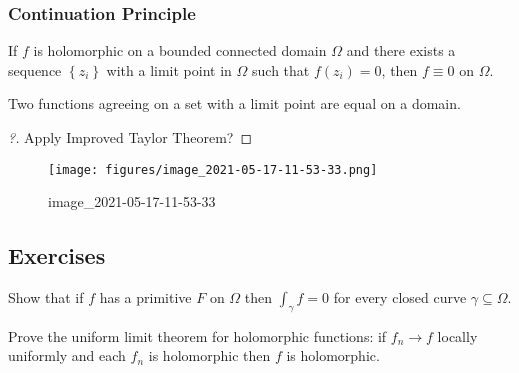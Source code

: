 \hypertarget{continuation-principle}{%
\subsubsection{Continuation Principle}\label{continuation-principle}}

\begin{theorem}

If \(f\) is holomorphic on a bounded connected domain \(\Omega\) and
there exists a sequence \(\left\{{z_i}\right\}\) with a limit point in
\(\Omega\) such that \(f(z_i) = 0\), then \(f\equiv 0\) on \(\Omega\).

\end{theorem}

\begin{slogan}

Two functions agreeing on a set with a limit point are equal on a
domain.

\end{slogan}

\begin{proof}[?]

Apply Improved Taylor Theorem? 

\end{proof}

\begin{exercise}[?]

\begin{figure}
\centering
\texttt{[image: figures/image\_2021-05-17-11-53-33.png]}
\caption{image\_2021-05-17-11-53-33}
\end{figure}

\end{exercise}

\hypertarget{exercises-2}{%
\subsection{Exercises}\label{exercises-2}}

\begin{exercise}

Show that if \(f\) has a primitive \(F\) on \(\Omega\) then
\(\int_\gamma f = 0\) for every closed curve
\(\gamma \subseteq \Omega\).

\end{exercise}

\begin{exercise}[?]

Prove the uniform limit theorem for holomorphic functions: if
\(f_n\to f\) locally uniformly and each \(f_n\) is holomorphic then
\(f\) is holomorphic.

\end{exercise}

